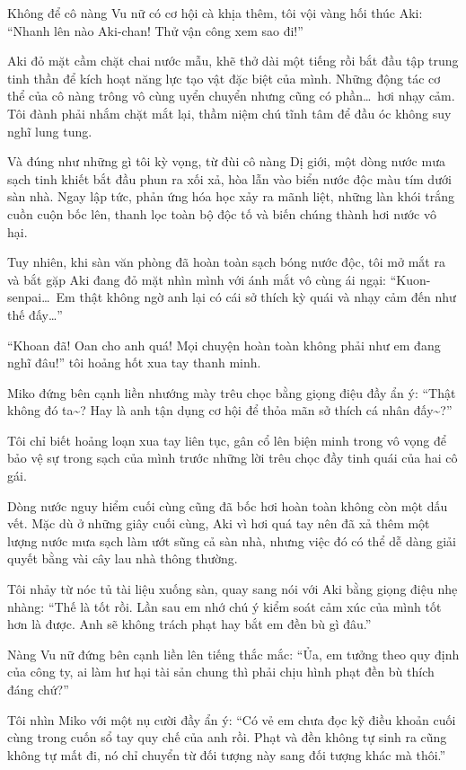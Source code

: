 \documentclass[../main.tex]{subfiles}
\begin{document}
Không để cô nàng Vu nữ có cơ hội cà khịa thêm, tôi vội vàng hối thúc Aki: ``Nhanh lên nào Aki-chan! Thử vận công xem sao đi!''

Aki đỏ mặt cầm chặt chai nước mẫu, khẽ thở dài một tiếng rồi bắt đầu tập trung tinh thần để kích hoạt năng lực tạo vật đặc biệt của mình. Những động tác cơ thể của cô nàng trông vô cùng uyển chuyển nhưng cũng có phần\dots\ hơi nhạy cảm. Tôi đành phải nhắm chặt mắt lại, thầm niệm chú tĩnh tâm để đầu óc không suy nghĩ lung tung.

Và đúng như những gì tôi kỳ vọng, từ đùi cô nàng Dị giới, một dòng nước mưa sạch tinh khiết bắt đầu phun ra xối xả, hòa lẫn vào biển nước độc màu tím dưới sàn nhà. Ngay lập tức, phản ứng hóa học xảy ra mãnh liệt, những làn khói trắng cuồn cuộn bốc lên, thanh lọc toàn bộ độc tố và biến chúng thành hơi nước vô hại.

Tuy nhiên, khi sàn văn phòng đã hoàn toàn sạch bóng nước độc, tôi mở mắt ra và bắt gặp Aki đang đỏ mặt nhìn mình với ánh mắt vô cùng ái ngại: ``Kuon-senpai\dots\ Em thật không ngờ anh lại có cái sở thích kỳ quái và nhạy cảm đến như thế đấy\dots''

``Khoan đã! Oan cho anh quá! Mọi chuyện hoàn toàn không phải như em đang nghĩ đâu!'' tôi hoảng hốt xua tay thanh minh.

Miko đứng bên cạnh liền nhướng mày trêu chọc bằng giọng điệu đầy ẩn ý: ``Thật không đó ta\~{}? Hay là anh tận dụng cơ hội để thỏa mãn sở thích cá nhân đấy\~{}?''

Tôi chỉ biết hoảng loạn xua tay liên tục, gân cổ lên biện minh trong vô vọng để bảo vệ sự trong sạch của mình trước những lời trêu chọc đầy tinh quái của hai cô gái.

\ct

Dòng nước nguy hiểm cuối cùng cũng đã bốc hơi hoàn toàn không còn một dấu vết. Mặc dù ở những giây cuối cùng, Aki vì hơi quá tay nên đã xả thêm một lượng nước mưa sạch làm ướt sũng cả sàn nhà, nhưng việc đó có thể dễ dàng giải quyết bằng vài cây lau nhà thông thường.

Tôi nhảy từ nóc tủ tài liệu xuống sàn, quay sang nói với Aki bằng giọng điệu nhẹ nhàng: ``Thế là tốt rồi. Lần sau em nhớ chú ý kiểm soát cảm xúc của mình tốt hơn là được. Anh sẽ không trách phạt hay bắt em đền bù gì đâu.''

Nàng Vu nữ đứng bên cạnh liền lên tiếng thắc mắc: ``Ủa, em tưởng theo quy định của công ty, ai làm hư hại tài sản chung thì phải chịu hình phạt đền bù thích đáng chứ?''

Tôi nhìn Miko với một nụ cười đầy ẩn ý: ``Có vẻ em chưa đọc kỹ điều khoản cuối cùng trong cuốn sổ tay quy chế của anh rồi. Phạt và đền không tự sinh ra cũng không tự mất đi, nó chỉ chuyển từ đối tượng này sang đối tượng khác mà thôi.''
\end{document}
